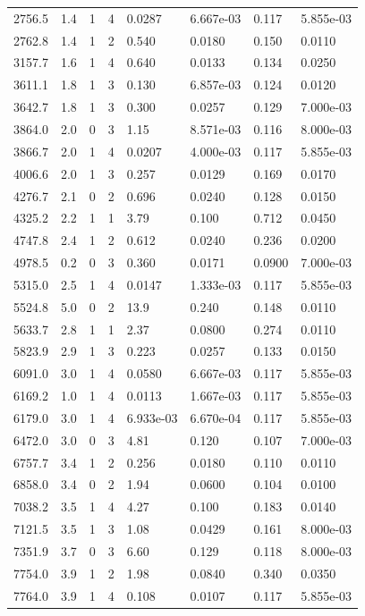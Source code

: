 \documentclass[preview]{standalone}
\begin{document}
{{\begin{tabular}{L{1.2cm}C{1.2cm} C{0.3cm}C{0.5cm} C{1.4cm}C{1.4cm} C{1.4cm}C{1.4cm}}
  2756.5  &   1.4  & 1     &  4 &  0.0287  & 6.667e-03  & 0.117 &  5.855e-03   \\ 
  2762.8  &   1.4  & 1     &  2 &  0.540  & 0.0180  & 0.150 &  0.0110   \\ 
  3157.7  &   1.6  & 1     &  4 &  0.640  & 0.0133  & 0.134 &  0.0250   \\ 
  3611.1  &   1.8  & 1     &  3 &  0.130  & 6.857e-03  & 0.124 &  0.0120   \\ 
  3642.7  &   1.8  & 1     &  3 &  0.300  & 0.0257  & 0.129 &  7.000e-03   \\ 
  3864.0  &   2.0  & 0     &  3 &  1.15  & 8.571e-03  & 0.116 &  8.000e-03   \\ 
  3866.7  &   2.0  & 1     &  4 &  0.0207  & 4.000e-03  & 0.117 &  5.855e-03   \\ 
  4006.6  &   2.0  & 1     &  3 &  0.257  & 0.0129  & 0.169 &  0.0170   \\ 
  4276.7  &   2.1  & 0     &  2 &  0.696  & 0.0240  & 0.128 &  0.0150   \\ 
  4325.2  &   2.2  & 1     &  1 &  3.79  & 0.100  & 0.712 &  0.0450   \\ 
  4747.8  &   2.4  & 1     &  2 &  0.612  & 0.0240  & 0.236 &  0.0200   \\ 
  4978.5  &   0.2  & 0     &  3 &  0.360  & 0.0171  & 0.0900 &  7.000e-03   \\ 
  5315.0  &   2.5  & 1     &  4 &  0.0147  & 1.333e-03  & 0.117 &  5.855e-03   \\ 
  5524.8  &   5.0  & 0     &  2 &  13.9  & 0.240  & 0.148 &  0.0110   \\ 
  5633.7  &   2.8  & 1     &  1 &  2.37  & 0.0800  & 0.274 &  0.0110   \\ 
  5823.9  &   2.9  & 1     &  3 &  0.223  & 0.0257  & 0.133 &  0.0150   \\ 
  6091.0  &   3.0  & 1     &  4 &  0.0580  & 6.667e-03  & 0.117 &  5.855e-03   \\ 
  6169.2  &   1.0  & 1     &  4 &  0.0113  & 1.667e-03  & 0.117 &  5.855e-03   \\ 
  6179.0  &   3.0  & 1     &  4 &  6.933e-03  & 6.670e-04  & 0.117 &  5.855e-03   \\ 
  6472.0  &   3.0  & 0     &  3 &  4.81  & 0.120  & 0.107 &  7.000e-03   \\ 
  6757.7  &   3.4  & 1     &  2 &  0.256  & 0.0180  & 0.110 &  0.0110   \\ 
  6858.0  &   3.4  & 0     &  2 &  1.94  & 0.0600  & 0.104 &  0.0100   \\ 
  7038.2  &   3.5  & 1     &  4 &  4.27  & 0.100  & 0.183 &  0.0140   \\ 
  7121.5  &   3.5  & 1     &  3 &  1.08  & 0.0429  & 0.161 &  8.000e-03   \\ 
  7351.9  &   3.7  & 0     &  3 &  6.60  & 0.129  & 0.118 &  8.000e-03   \\ 
  7754.0  &   3.9  & 1     &  2 &  1.98  & 0.0840  & 0.340 &  0.0350   \\ 
  7764.0  &   3.9  & 1     &  4 &  0.108  & 0.0107  & 0.117 &  5.855e-03   \\ 
\hline 
\end{tabular} 

}}
\end{document}
